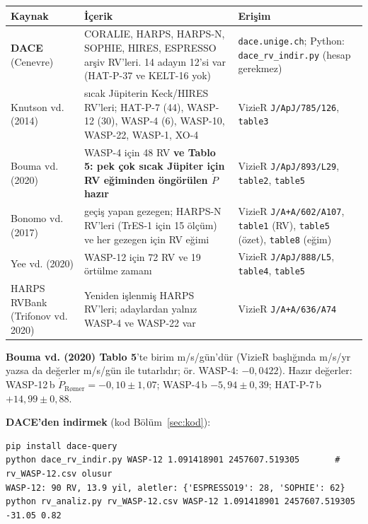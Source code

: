 \begin{center}
\small
\begin{tabularx}{\textwidth}{l >{\raggedright\arraybackslash}X >{\raggedright\arraybackslash}X}
\toprule
Kaynak & İçerik & Erişim\\
\midrule
\textbf{DACE} (Cenevre) & CORALIE, HARPS, HARPS-N, SOPHIE, HIRES, ESPRESSO arşiv RV'leri. 14 adayın 12'si var
  (HAT-P-37 ve KELT-16 yok) & \texttt{dace.unige.ch}; Python: \texttt{dace\_rv\_indir.py} (hesap gerekmez)\\
Knutson vd. (2014) & 51 sıcak Jüpiterin Keck/HIRES RV'leri; HAT-P-7 (44), WASP-12 (30), WASP-4 (6), WASP-10, WASP-22, WASP-1, XO-4 &
  VizieR \texttt{J/ApJ/785/126}, \texttt{table3}\\
Bouma vd. (2020) & WASP-4 için 48 RV \textbf{ve Tablo 5: pek çok sıcak Jüpiter için RV eğiminden öngörülen $\dot P$ hazır} &
  VizieR \texttt{J/ApJ/893/L29}, \texttt{table2}, \texttt{table5}\\
Bonomo vd. (2017) & 231 geçiş yapan gezegen; HARPS-N RV'leri (TrES-1 için 15 ölçüm) ve her gezegen için RV eğimi &
  VizieR \texttt{J/A+A/602/A107}, \texttt{table1} (RV), \texttt{table5} (özet), \texttt{table8} (eğim)\\
Yee vd. (2020) & WASP-12 için 72 RV ve 19 örtülme zamanı & VizieR \texttt{J/ApJ/888/L5}, \texttt{table4}, \texttt{table5}\\
HARPS RVBank (Trifonov vd. 2020) & Yeniden işlenmiş HARPS RV'leri; adaylardan yalnız WASP-4 ve WASP-22 var & VizieR \texttt{J/A+A/636/A74}\\
\bottomrule
\end{tabularx}
\end{center}
\textbf{Bouma vd. (2020) Tablo 5}'te birim m/s/gün'dür (VizieR başlığında m/s/yr yazsa da değerler m/s/gün ile tutarlıdır;
ör. WASP-4: $-0{,}0422$). Hazır değerler: WASP-12\,b $\dot P_\text{Rømer} = -0{,}10\pm1{,}07$; WASP-4\,b $-5{,}94\pm0{,}39$;
HAT-P-7\,b $+14{,}99\pm0{,}88$\msyil.

\textbf{DACE'den indirmek} (kod Bölüm~\ref{sec:kod}):
\begin{lstlisting}[style=kabuk]
pip install dace-query
python dace_rv_indir.py WASP-12 1.091418901 2457607.519305       # rv_WASP-12.csv olusur
WASP-12: 90 RV, 13.9 yil, aletler: {'ESPRESSO19': 28, 'SOPHIE': 62}
python rv_analiz.py rv_WASP-12.csv WASP-12 1.091418901 2457607.519305 -31.05 0.82
\end{lstlisting}

